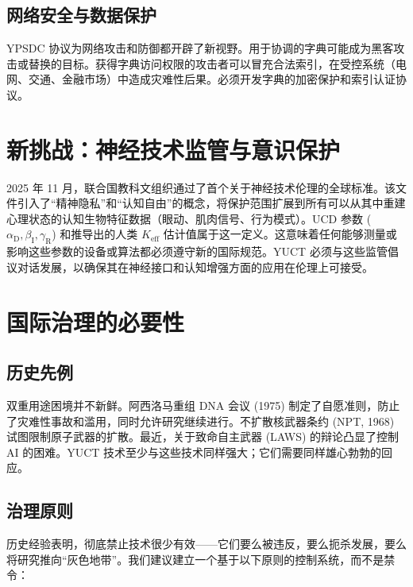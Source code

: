 \documentclass[12pt,a4paper]{article}
\theoremstyle{remark}
\newcommand{\Keff}{K_{\mathrm{eff}}}
\newcommand{\alD}{\alpha_{\mathrm{D}}}
\newcommand{\beI}{\beta_{\mathrm{I}}}
\newcommand{\gaR}{\gamma_{\mathrm{R}}}
\begin{document}
	\subsection{网络安全与数据保护}
	\label{subsec:cyber}
	
	YPSDC 协议为网络攻击和防御都开辟了新视野。用于协调的字典可能成为黑客攻击或替换的目标。获得字典访问权限的攻击者可以冒充合法索引，在受控系统（电网、交通、金融市场）中造成灾难性后果。必须开发字典的加密保护和索引认证协议。
	
	\section{新挑战：神经技术监管与意识保护}
	\label{sec:neuroethics}
	
	2025 年 11 月，联合国教科文组织通过了首个关于神经技术伦理的全球标准。该文件引入了“精神隐私”和“认知自由”的概念，将保护范围扩展到所有可以从其中重建心理状态的认知生物特征数据（眼动、肌肉信号、行为模式）。UCD 参数 (\(\alD,\beI,\gaR\)) 和推导出的人类 \(\Keff\) 估计值属于这一定义。这意味着任何能够测量或影响这些参数的设备或算法都必须遵守新的国际规范。YUCT 必须与这些监管倡议对话发展，以确保其在神经接口和认知增强方面的应用在伦理上可接受。
	
	\section{国际治理的必要性}
	\label{sec:governance}
	
	\subsection{历史先例}
	\label{subsec:precedents}
	
	双重用途困境并不新鲜。阿西洛马重组 DNA 会议 (1975) 制定了自愿准则，防止了灾难性事故和滥用，同时允许研究继续进行。不扩散核武器条约 (NPT, 1968) 试图限制原子武器的扩散。最近，关于致命自主武器 (LAWS) 的辩论凸显了控制 AI 的困难。YUCT 技术至少与这些技术同样强大；它们需要同样雄心勃勃的回应。
	
	\subsection{治理原则}
	\label{subsec:principles}
	
	历史经验表明，彻底禁止技术很少有效——它们要么被违反，要么扼杀发展，要么将研究推向“灰色地带”。我们建议建立一个基于以下原则的控制系统，而不是禁令：
	
\end{document}

